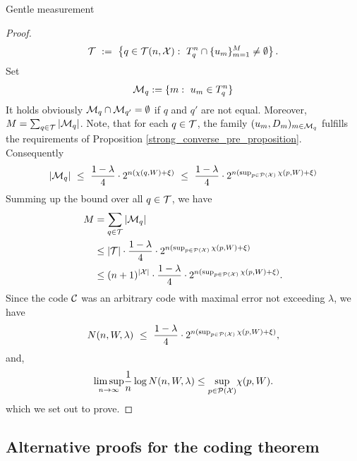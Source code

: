 \begin{subsubsection}{Gentle measurement}
\begin{proof}
\begin{align}
          {\mathcal T} \ := \ \left\{q \in {\mathcal T}(n,{\mathcal X}): \ T_q^n \cap \{u_m\}_{m=1}^M \neq \emptyset \right\}.
         \end{align}
	 Set 
	 \begin{align}
	  {\mathcal M}_q := \{m: \ u_m \in T_q^n \}
	 \end{align}
	 It holds obviously ${\mathcal M}_q \cap {\mathcal M}_{q'} = \emptyset$ if $q$ and $q'$ are not equal. Moreover, $M = \sum_{q \in {\mathcal T}} |{\mathcal M}_q|$.
	 Note, that for each $q \in {\mathcal T}$, the family $(u_m,D_m)_{m \in {\mathcal M}_q}$ fulfills the requirements of Proposition \ref{strong_converse_pre_proposition}. Consequently 
	 \begin{align}
	  |{\mathcal M}_q| \ \leq \ \frac{1 -\lambda}{4} \cdot 2^{n(\chi(q,W) +\xi)} \ \leq \ \frac{1 -\lambda}{4} \cdot 2^{n(\sup_{p \in {\mathcal P}({\mathcal X})}\chi(p,W) +\xi)}
	 \end{align}
	 Summing up the bound over all $q \in {\mathcal T}$, we have
	 \begin{align}
	  M 
	  & = \sum_{q \in {\mathcal T}} |{\mathcal M}_q| \\
	  & \leq |{\mathcal T}| \cdot \frac{1 -\lambda}{4} \cdot 2^{n(\sup_{p \in {\mathcal P}({\mathcal X})}\chi(p,W) +\xi)}\\
	  & \leq (n+1)^{|{\mathcal X}|} \cdot \frac{1 -\lambda}{4} \cdot 2^{n(\sup_{p \in {\mathcal P}({\mathcal X})}\chi(p,W) +\xi)}.
	 \end{align}
	  Since the code ${\mathcal C}$ was an arbitrary code with maximal error not exceeding $\lambda$, we have 
	 \begin{align}
	  N(n,W,\lambda) \ \leq \ \frac{1 -\lambda}{4} \cdot 2^{n(\sup_{p \in {\mathcal P}({\mathcal X})}\chi(p,W) +\xi)},
	 \end{align}
	  and, 
	  \begin{align}
	  \underset{n \rightarrow \infty}{\limsup} \frac{1}{n} \log N(n,W,\lambda) \leq \underset{p \in {\mathcal P}({\mathcal X})}{\sup} \chi(p,W).
	 \end{align}
	  which we set out to prove. 
	 \end{proof}
     \end{subsubsection}

    
     
      
     
     
     \subsection{Alternative proofs for the coding theorem}
     
     